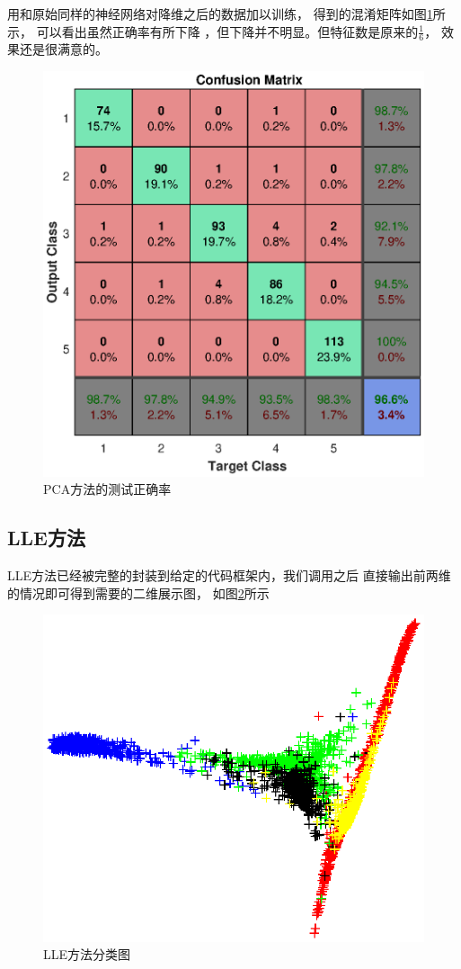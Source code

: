 \documentclass[UTF8,a4paper]{paper}
\begin{document}
用和原始同样的神经网络对降维之后的数据加以训练，
得到的混淆矩阵如图\ref{fig4}所示，
可以看出虽然正确率有所下降
，但下降并不明显。但特征数是原来的$\frac{1}{6}$，
效果还是很满意的。

\begin{figure}
\centering
\includegraphics[width=\textwidth]{NNpca.eps}
\caption{PCA方法的测试正确率}
\label{fig4}
\end{figure}
\subsection{LLE方法}

LLE方法已经被完整的封装到给定的代码框架内，我们调用之后
直接输出前两维的情况即可得到需要的二维展示图，
如图\ref{fig5}所示

\begin{figure}
\centering
\includegraphics[width=\textwidth]{lle.eps}
\caption{LLE方法分类图}
\label{fig5}
\end{figure}
\end{document}
